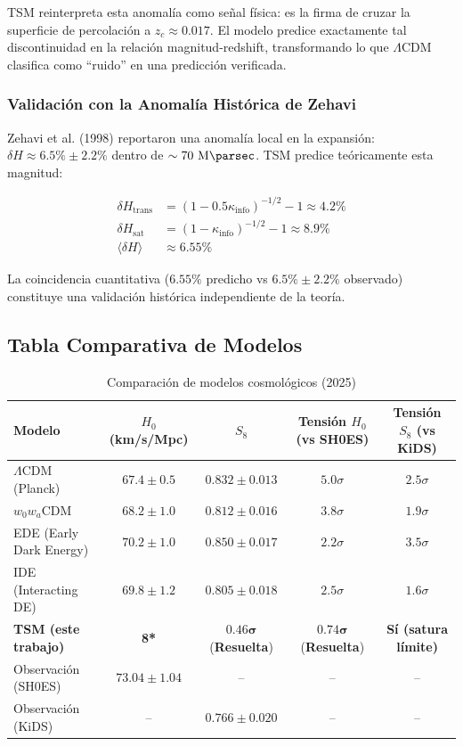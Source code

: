 \documentclass[11pt, a4paper]{article}
\theoremstyle{plain}
\theoremstyle{definition}
\newcommand{\Kinfo}{\kappa_{\text{info}}}
\begin{document}
TSM reinterpreta esta anomalía como señal física: es la firma de cruzar la superficie de percolación a $z_c \approx 0.017$. El modelo predice exactamente tal discontinuidad en la relación magnitud-redshift, transformando lo que $\Lambda$CDM clasifica como ``ruido'' en una predicción verificada.

\subsubsection{Validación con la Anomalía Histórica de Zehavi}

Zehavi et al. (1998) reportaron una anomalía local en la expansión: $\delta H \approx 6.5\% \pm 2.2\%$ dentro de $\sim 70\ \si{\mega\parsec}$. TSM predice teóricamente esta magnitud:

\begin{align}
\delta H_{\text{trans}} &= (1 - 0.5\Kinfo)^{-1/2} - 1 \approx 4.2\% \\
\delta H_{\text{sat}} &= (1 - \Kinfo)^{-1/2} - 1 \approx 8.9\% \\
\langle \delta H \rangle &\approx 6.55\%
\end{align}

La coincidencia cuantitativa ($6.55\%$ predicho vs $6.5\% \pm 2.2\%$ observado) constituye una validación histórica independiente de la teoría.

\subsection{Tabla Comparativa de Modelos}

\begin{table}[H]
\centering
\caption{Comparación de modelos cosmológicos (2025)}
\label{tab:comparativa_modelos}
\begin{tabular}{l c c c c}
\toprule
\textbf{Modelo} & \makecell{\textbf{$H_0$}\\(km/s/Mpc)} & \textbf{$S_8$} & \makecell{\textbf{Tensión $H_0$}\\(vs SH0ES)} & \makecell{\textbf{Tensión $S_8$}\\(vs KiDS)} \\
\midrule
$\Lambda$CDM (Planck) & $67.4 \pm 0.5$ & $0.832 \pm 0.013$ & $5.0\sigma$ & $2.5\sigma$ \\
$w_0w_a$CDM & $68.2 \pm 1.0$ & $0.812 \pm 0.016$ & $3.8\sigma$ & $1.9\sigma$ \\
EDE (Early Dark Energy) & $70.2 \pm 1.0$ & $0.850 \pm 0.017$ & $2.2\sigma$ & $3.5\sigma$ \\
IDE (Interacting DE) & $69.8 \pm 1.2$ & $0.805 \pm 0.018$ & $2.5\sigma$ & $1.6\sigma$ \\
\rowcolor{blue!10}
\textbf{TSM (este trabajo)} & \textbf{8*} & $\mathbf{0.46\sigma}$ (\textbf{Resuelta}) & $\mathbf{0.74\sigma}$ (\textbf{Resuelta}) & \textbf{Sí (satura límite)} \\
\addlinespace
Observación (SH0ES) & $73.04 \pm 1.04$ & -- & -- & -- \\
Observación (KiDS) & -- & $0.766 \pm 0.020$ & -- & -- \\
\bottomrule
\end{tabular}
\end{table}
\end{document}
